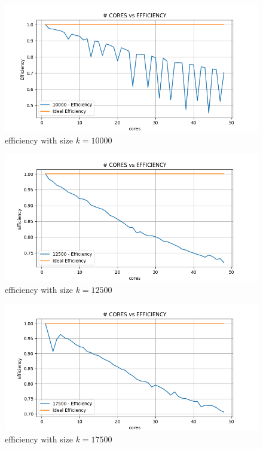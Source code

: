 \documentclass[12pt, titlepage]{report}
\begin{document}
\begin{figure}[H]
	\centering
	\includegraphics[width=\textwidth]{Assignment-1/MPI_strong-static-10000-10-THIN10000_efficiency.png}
	\caption{efficiency with size $k=10000$}
\end{figure}
\begin{figure}[H]
	\centering
	\includegraphics[width=\textwidth]{Assignment-1/MPI_strong-static-12500-10-THIN12500_efficiency.png}
	\caption{efficiency with size $k=12500$}
\end{figure}
\begin{figure}[H]
	\centering
	\includegraphics[width=\textwidth]{Assignment-1/MPI_strong-static-17500-10-THIN17500_efficiency.png}
	\caption{efficiency with size $k=17500$}
\end{figure}
\end{document}
